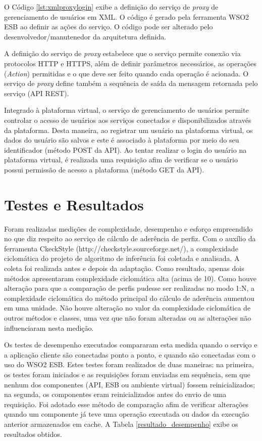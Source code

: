 O Código \ref{lst:xmlproxylogin} exibe a definição do serviço de \textit{proxy} de gerenciamento de usuários em XML. O código é gerado pela ferramenta WSO2 ESB ao definir as ações do serviço. O código pode ser alterado pelo desenvolvedor/manutenedor da arquitetura definida.

A definição do serviço de \textit{proxy} estabelece que o serviço permite conexão via protocolos HTTP e HTTPS, além de definir parâmetros necessários, as operações (\textit{Action}) permitidas e o que deve ser feito quando cada operação é acionada. O serviço de \textit{proxy} define também a sequência de saída da mensagem retornada pelo serviço (API REST).

Integrado à plataforma virtual, o serviço de gerenciamento de usuários permite controlar o acesso de usuários aos serviços conectados e disponibilizados através da plataforma. Desta maneira, ao registrar um usuário na plataforma virtual, os dados do usuário são salvos e este é associado à plataforma por meio do seu identificador (método POST da API). Ao tentar realizar o login do usuário na plataforma virtual, é realizada uma requisição afim de verificar se o usuário possui permissão de acesso a plataforma (método GET da API).

\section{Testes e Resultados}
Foram realizadas medições de complexidade, desempenho e esforço empreendido no que diz respeito ao serviço de cálculo de aderência de perfiz. Com o auxílio da ferramenta CkeckStyle (http://checkstyle.sourceforge.net/), a complexidade ciclomática do projeto de algoritmo de inferência foi coletada e analisada. A coleta foi realizada antes e depois da adaptação. Como resultado, apenas dois métodos apresentaram complexidade ciclomática alta (acima de 10). Como houve alteração para que a comparação de perfis pudesse ser realizadas no modo 1:N, a complexidade ciclomática do método principal do cálculo de aderência aumentou em uma unidade. Não houve alteração no valor da complexidade ciclomática de outros métodos e classes, uma vez que não foram alteradas ou as alterações não influenciaram nesta medição.

Os testes de desempenho executados compararam esta medida quando o serviço e a aplicação cliente são conectadas ponto a ponto, e quando são conectadas com o uso do WSO2 ESB. Estes testes foram realizados de duas maneiras: na primeira, os testes foram iniciados e as requisições foram enviadas em sequência, sem que nenhum dos componentes (API, ESB ou ambiente virtual) fossem reinicializados; na segunda, os componentes eram reinicializados antes do envio de uma requisição. Foi adotado esse método de comparação afim de verificar alterações quando um componente já teve uma operação executada ou dados da execução anterior armazenados em cache. A Tabela \ref{resultado_desempenho} exibe os resultados obtidos.


